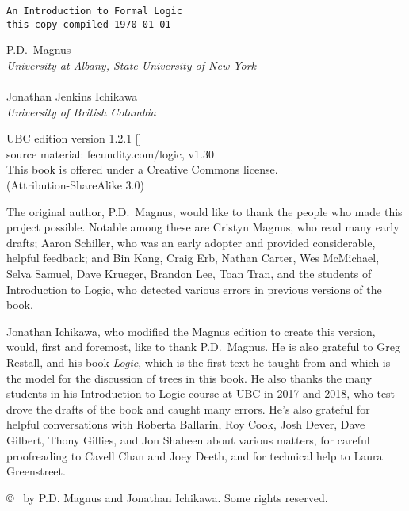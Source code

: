 \thispagestyle{empty}
{\Huge\forallx}

{\tt An Introduction to Formal Logic\\
this copy compiled \today}
\vfill


{\sf P.D.\ Magnus}\\
\emph{University at Albany, State University of New York}\\
\\
{\sf Jonathan Jenkins Ichikawa}\\
\emph{University of British Columbia}



\vfill




{\sf
	UBC edition version 1.2.1 [\bookversion]\\
	source material: fecundity.com/logic, v1.30\\
	This book is offered under a Creative Commons license.\\
	(Attribution-ShareAlike 3.0)
}



\newpage
\thispagestyle{empty}%
{\sf
The original author, P.D.\ Magnus, would like to thank the people who made this project possible. Notable among these are Cristyn Magnus, who read many early drafts; Aaron Schiller, who was an early adopter and provided considerable, helpful feedback; {and} Bin Kang, Craig Erb, Nathan Carter, Wes McMichael, Selva Samuel,  Dave Krueger, Brandon Lee, Toan Tran, and the students of Introduction to Logic, who detected various errors in previous versions of the book.

Jonathan Ichikawa, who modified the Magnus edition to create this version, would, first and foremost, like to thank P.D.\ Magnus. He is also grateful to Greg Restall, and his book \emph{Logic}, which is the first text he taught from and which is the model for the discussion of trees in this book. He also thanks the many students in his Introduction to Logic course at UBC in 2017 and 2018, who test-drove the drafts of the book and caught many errors. He's also grateful for helpful conversations with Roberta Ballarin, Roy Cook, Josh Dever, Dave Gilbert, Thony Gillies, and Jon Shaheen about various matters, for careful proofreading to Cavell Chan and Joey Deeth, and for technical help to Laura Greenstreet.

}

\vfill
{
\copyright\  by P.D. Magnus and Jonathan Ichikawa. Some rights reserved.
}

